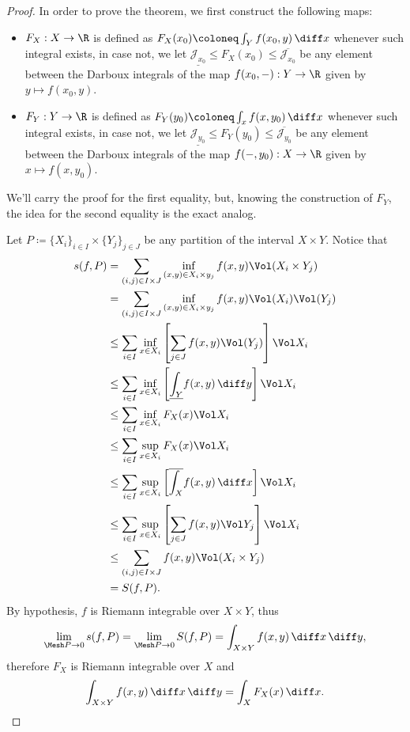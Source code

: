 \begin{proof}
In order to prove the theorem, we first construct the following maps:
\begin{itemize}\setlength\itemsep{0em}
\item \(F_X: X \to \R\) is defined as \(F_{X}(x_0) \coloneq \int_Y f(x_0, y)\,
  \diff x\) whenever such integral exists, in case not, we let
  \(\underline{\mathcal{J}_{x_0}} \leq F_{X}(x_0) \leq
  \overline{\mathcal{J}_{x_0}}\) be any element between the Darboux integrals of
  the map \(f(x_{0}, -): Y \to \R\) given by \(y \mapsto f(x_{0}, y)\).

\item \(F_Y: Y \to \R\) is defined as \(F_{Y}(y_{0}) \coloneq \int_x f(x,
  y_{0})\, \diff x\) whenever such integral exists, in case not, we let
  \(\underline{\mathcal{J}_{y_0}} \leq F_{Y}(y_{0}) \leq
  \overline{\mathcal{J}_{y_0}}\) be any element between the Darboux integrals of
  the map \(f(-, y_0): X \to \R\) given by \(x \mapsto f(x, y_{0})\).
\end{itemize}
We'll carry the proof for the first equality, but, knowing the construction of
\(F_Y\), the idea for the second equality is the exact analog.

Let \(P \coloneq \{X_{i}\}_{i \in I} \times \{Y_{j}\}_{j \in J}\) be any
partition of the interval \(X \times Y\). Notice that
\begin{align*}
  s(f, P)
  &= \sum_{(i, j) \in I \times J}
    \inf_{(x, y) \in X_i \times y_j}f(x, y) \Vol(X_i \times Y_j) \\
  &= \sum_{(i, j) \in I \times J}
    \inf_{(x, y) \in X_i \times y_j}f(x, y) \Vol(X_i) \Vol(Y_j) \\
  &\leq \sum_{i \in I}
    \inf_{x \in X_i} \left[ \sum_{j \in J} f(x, y) \Vol(Y_j) \right] \Vol X_i  \\
  &\leq \sum_{i \in I} \inf_{x \in X_i} \left[ \underline{\int_{Y}} f(x, y)\,
    \diff y \right] \Vol X_i \\
  &\leq \sum_{i \in I} \inf_{x \in X_i} F_X(x) \Vol X_i \\
  &\leq \sum_{i \in I} \sup_{x \in X_i} F_X(x) \Vol X_i \\
  &\leq \sum_{i \in I} \sup_{x \in X_i} \left[ \overline{\int_X} f(x, y)\, \diff
  x \right] \Vol X_i \\
  &\leq \sum_{i \in I} \sup_{x \in X_i} \left[ \sum_{j \in J} f(x, y) \Vol Y_j
    \right] \Vol X_i \\
  &\leq \sum_{(i, j) \in I \times J} f(x, y) \Vol(X_i \times Y_j) \\
  &= S(f, P).
\end{align*}
By hypothesis, \(f\) is Riemann integrable over \(X \times Y\), thus
\[
  \lim_{\Mesh P \to 0} s(f, P)
  = \lim_{\Mesh P \to 0} S(f, P)
  = \int_{X \times Y} f(x, y)\, \diff x\, \diff y,
\]
therefore \(F_X\) is Riemann integrable over
\(X\) and
\[
  \int_{X \times Y} f(x, y)\, \diff x\, \diff y = \int_X F_X(x)\, \diff x.
\]
\end{proof}

